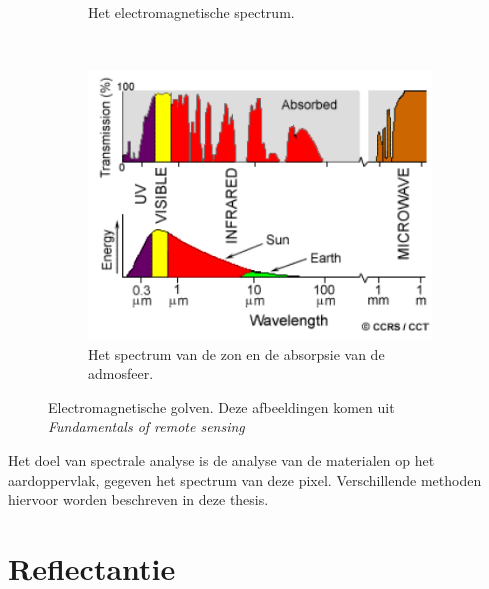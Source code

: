 \documentclass[12pt]{report}
\newcommand{\rulesep}{\unskip\ \vrule height -1ex\ }
\begin{document}
\begin{figure}
\begin{subfigure}[b]{0.2\textwidth}
\caption{Het electromagnetische spectrum. \label{fig:spec}}
\end{subfigure}\rulesep
\begin{subfigure}[b]{0.4\textwidth}
\includegraphics[width=\textwidth]{spec2.PNG}
\caption{Het spectrum van de zon en de absorpsie van de admosfeer.\label{fig:specs}}
\end{subfigure}
\caption{Electromagnetische golven. Deze afbeeldingen komen uit \textit{Fundamentals of remote sensing\cite{fun}}\label{fig:rs2}}
\end{figure}


Het doel van spectrale analyse is de analyse van de materialen op het aardoppervlak, gegeven het spectrum van deze pixel. Verschillende methoden hiervoor worden beschreven in deze thesis. 

\section{Reflectantie} \label{sec:ref}

\end{document}
